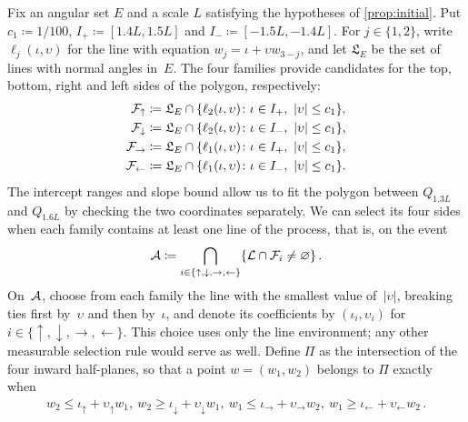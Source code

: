\documentclass[11pt,letterpaper]{article}
\begin{document}
Fix an angular set $E$ and a scale $L$ satisfying the hypotheses of \cref{prop:initial}. Put $c_1\coloneqq1/100$, $I_+\coloneqq[1.4L,1.5L]$ and $I_-\coloneqq[-1.5L,-1.4L]$. For $j\in\{1,2\}$, write $\ell_j(\iota,\upsilon)$ for the line with equation $w_j=\iota+\upsilon w_{3-j}$, and let $\mathfrak L_E$ be the set of lines with normal angles in~$E$. The four families provide candidates for the top, bottom, right and left sides of the polygon, respectively:
\begin{equation*}
  \begin{aligned}
    \cF_{\uparrow}&\coloneqq\mathfrak L_E\cap\{\ell_2(\iota,\upsilon)\colon \iota\in I_+,\ \lvert\upsilon\rvert\le c_1\},\\
    \cF_{\downarrow}&\coloneqq\mathfrak L_E\cap\{\ell_2(\iota,\upsilon)\colon \iota\in I_-,\ \lvert\upsilon\rvert\le c_1\},\\
    \cF_{\rightarrow}&\coloneqq\mathfrak L_E\cap\{\ell_1(\iota,\upsilon)\colon \iota\in I_+,\ \lvert\upsilon\rvert\le c_1\},\\
    \cF_{\leftarrow}&\coloneqq\mathfrak L_E\cap\{\ell_1(\iota,\upsilon)\colon \iota\in I_-,\ \lvert\upsilon\rvert\le c_1\}.
  \end{aligned}
\end{equation*}
The intercept ranges and slope bound allow us to fit the polygon between $Q_{1.3L}$ and $Q_{1.6L}$ by checking the two coordinates separately. We can select its four sides when each family contains at least one line of the process, that is, on the event
\begin{equation*}
  \mathcal A\coloneqq\bigcap_{i\in\{\uparrow,\downarrow,\rightarrow,\leftarrow\}}
  \{\mathcal L\cap\mathcal F_i\neq\varnothing\}\,.
\end{equation*}
On~$\mathcal A$, choose from each family the line with the smallest value of~$\lvert\upsilon\rvert$, breaking ties first by~$\upsilon$ and then by~$\iota$, and denote its coefficients by $(\iota_i,\upsilon_i)$ for $i\in\{\uparrow,\downarrow,\rightarrow,\leftarrow\}$. This choice uses only the line environment; any other measurable selection rule would serve as well. Define $\Pi$ as the intersection of the four inward half-planes, so that a point $w=(w_1,w_2)$ belongs to $\Pi$ exactly when
\begin{equation}\label{eq:polygon-definition}
  \begin{aligned}
    w_2\le \iota_{\uparrow}+\upsilon_{\uparrow}w_1,\  w_2\ge \iota_{\downarrow}+\upsilon_{\downarrow}w_1,\  w_1\le \iota_{\rightarrow}+\upsilon_{\rightarrow}w_2,\ w_1\ge \iota_{\leftarrow}+\upsilon_{\leftarrow}w_2\,.
  \end{aligned}
\end{equation}
\end{document}
